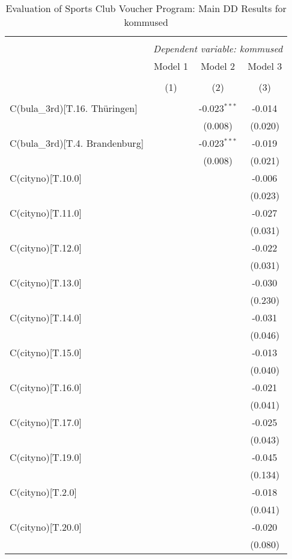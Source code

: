 \begin{table}[!htbp] \centering
  \caption{Evaluation of Sports Club Voucher Program: Main DD Results for kommused}
\begin{tabular}{@{\extracolsep{5pt}}lccc}
\\[-1.8ex]\hline
\hline \\[-1.8ex]
& \multicolumn{3}{c}{\textit{Dependent variable: kommused}} \
\cr \cline{2-4}
\\[-1.8ex] & \multicolumn{1}{c}{Model 1} & \multicolumn{1}{c}{Model 2} & \multicolumn{1}{c}{Model 3}  \\
\\[-1.8ex] & (1) & (2) & (3) \\
\hline \\[-1.8ex]
 C(bula_3rd)[T.16. Thüringen] & & -0.023$^{***}$ & -0.014$^{}$ \\
& & (0.008) & (0.020) \\
 C(bula_3rd)[T.4. Brandenburg] & & -0.023$^{***}$ & -0.019$^{}$ \\
& & (0.008) & (0.021) \\
 C(cityno)[T.10.0] & & & -0.006$^{}$ \\
& & & (0.023) \\
 C(cityno)[T.11.0] & & & -0.027$^{}$ \\
& & & (0.031) \\
 C(cityno)[T.12.0] & & & -0.022$^{}$ \\
& & & (0.031) \\
 C(cityno)[T.13.0] & & & -0.030$^{}$ \\
& & & (0.230) \\
 C(cityno)[T.14.0] & & & -0.031$^{}$ \\
& & & (0.046) \\
 C(cityno)[T.15.0] & & & -0.013$^{}$ \\
& & & (0.040) \\
 C(cityno)[T.16.0] & & & -0.021$^{}$ \\
& & & (0.041) \\
 C(cityno)[T.17.0] & & & -0.025$^{}$ \\
& & & (0.043) \\
 C(cityno)[T.19.0] & & & -0.045$^{}$ \\
& & & (0.134) \\
 C(cityno)[T.2.0] & & & -0.018$^{}$ \\
& & & (0.041) \\
 C(cityno)[T.20.0] & & & -0.020$^{}$ \\
& & & (0.080) \\

\end{tabular}
\end{table}

